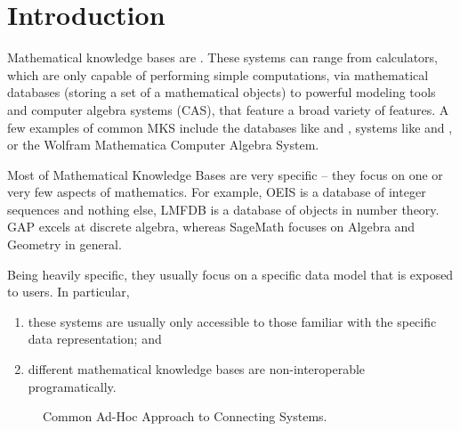 \section{Introduction}\label{sec:intro}


Mathematical knowledge bases are . 
These systems can range from calculators, which are only capable of performing simple computations, via mathematical databases (storing a set of a mathematical objects) to powerful modeling tools and computer algebra systems (CAS), that feature a broad variety of features.
A few examples of common MKS include the databases like \cite{oeis} and \cite{lmfdb}, systems like \cite{gap} and \cite{sagemath}, or the Wolfram Mathematica \cite{mathematica11} Computer Algebra System. 


Most of Mathematical Knowledge Bases are very specific -- they focus on one or very few aspects of mathematics. 
For example, OEIS is a database of integer sequences and nothing else, 
LMFDB is a database of objects in number theory. 
GAP excels at discrete algebra, whereas SageMath focuses on Algebra and Geometry in general. 

Being heavily specific, they usually focus on a specific data model that is exposed to users. 
In particular, 
\begin{enumerate}
  \item these systems are usually only accessible to those familiar with the specific data representation; and
  \item different mathematical knowledge bases are non-interoperable programatically. 
\end{enumerate}

\begin{wrapfigure}{r}{0.25\textwidth}
  \begin{center}
  \end{center}

  \caption[Classical Approach to connecting systems]{
    Common Ad-Hoc Approach to Connecting Systems. 
  }
  \label{fig:classicalconnect}
\end{wrapfigure}



